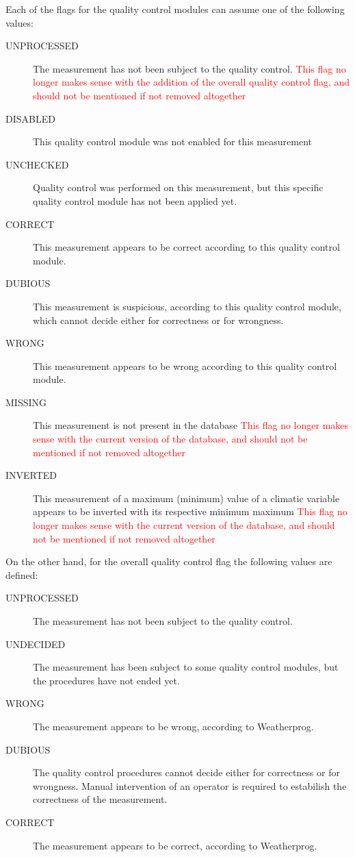 \documentclass[authoryear,preprint,review,12pt]{elsarticle}
\begin{document}
Each of the flags for the quality control modules can assume one of the following values:
\begin{description}
	\item[UNPROCESSED] The measurement has not been subject to the quality control. \textcolor{Red}{This flag no longer makes sense with the addition of the overall quality control flag, and should not be mentioned if not removed altogether}
	\item[DISABLED] This quality control module was not enabled for this measurement
	\item[UNCHECKED] Quality control was performed on this measurement, but this specific quality control module has not been applied yet.
	\item[CORRECT] This measurement appears to be correct according to this quality control module.
	\item[DUBIOUS] This measurement is suspicious, according to this quality control module, which cannot decide either for correctness or for wrongness.
	\item[WRONG] This measurement appears to be wrong according to this quality control module.
	\item[MISSING] This measurement is not present in the database \textcolor{Red}{This flag no longer makes sense with the current version of the database, and should not be mentioned if not removed altogether}
	\item[INVERTED] This measurement of a maximum (minimum) value of a climatic variable appears to be inverted with its respective minimum {maximum} \textcolor{Red}{This flag no longer makes sense with the current version of the database, and should not be mentioned if not removed altogether}
\end{description}

On the other hand, for the overall quality control flag the following values are defined:
\begin{description}
	\item[UNPROCESSED] The measurement has not been subject to the quality control.
	\item[UNDECIDED] The measurement has been subject to some quality control modules, but the procedures have not ended yet.
	\item[WRONG] The measurement appears to be wrong, according to Weatherprog.
	\item[DUBIOUS] The quality control procedures cannot decide either for correctness or for wrongness. Manual intervention of an operator is required to estabilish the correctness of the measurement.
	\item[CORRECT] The measurement appears to be correct, according to Weatherprog.
\end{description} 
\end{document}
